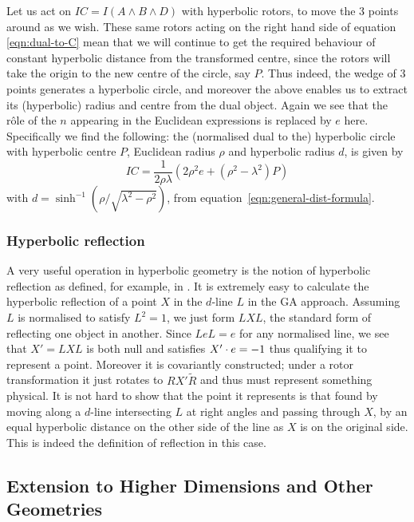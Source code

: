 %
Let us act on $IC=I(A \wedge B \wedge D)$ with hyperbolic rotors,
to move the 3 points around as we wish. These same rotors acting
on the right hand side of equation \ref{eqn:dual-to-C} mean that we will
continue to get the required behaviour of constant hyperbolic
distance from the transformed centre, since the rotors will take
the origin to the new centre of the circle, say $P$. Thus indeed,
the wedge of 3 points generates a hyperbolic circle, and
moreover the above enables us to extract its (hyperbolic)
radius and centre from the dual object. Again we see that the
r\^ole of the $n$ appearing in the Euclidean expressions is
replaced by $e$ here. Specifically we find the following: the
(normalised dual to the) hyperbolic circle with hyperbolic
centre $P$, Euclidean radius $\rho$ and hyperbolic radius $d$,
is given by
%
\begin{equation}\label{eqn:non-e-circle}
IC = \frac{1}{2 \rho \lambda} \left( 2 \rho^2 e +
(\rho^2-\lambda^2) P \right)
\end{equation}
%
with $d= \sinh^{-1} (\rho/\sqrt{\lambda^2-\rho^2})$, from
equation~\ref{eqn:general-dist-formula}.

\subsubsection{Hyperbolic reflection}

A very useful operation in hyperbolic geometry is the notion of
hyperbolic reflection as defined, for example, in \cite{GEOM:Brannan}. 
It is extremely easy to calculate the hyperbolic
reflection of a point $X$ in the $d$-line $L$ in the GA approach.
Assuming $L$ is normalised to satisfy $L^2=1$, we just form $LXL$,
the standard form of reflecting one object in another. Since $L e
L = e$ for any normalised line, we see that $X'=LXL$ is both
null and satisfies $X' \cdot e=-1$ thus qualifying it to represent a
point. Moreover it is covariantly constructed;
under a rotor transformation it just rotates to $R X'
\tilde{R}$ and thus must represent something physical. It is not
hard to show that the point it represents is that found by moving
along a $d$-line intersecting $L$ at right angles and passing
through $X$, by an equal hyperbolic distance on the other side
of the line as $X$ is on the original side. This is indeed the
definition of reflection in this case.

\subsection{Extension to Higher Dimensions and Other Geometries}


